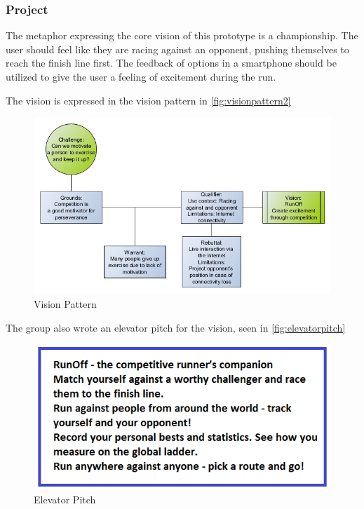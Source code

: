 \subsubsection{Project}
The metaphor expressing the core vision of this prototype is a championship. The user should feel like they are racing against an opponent, pushing themselves to reach the finish line first. The feedback of options in a smartphone should be utilized to give the user a feeling of excitement during the run.

The vision is expressed in the vision pattern in \autoref{fig:visionpattern2}

\begin{figure}[ht]
\begin{center}
 \caption{Vision Pattern}
 \label{fig:visionpattern2}
 \includegraphics[scale=0.5]{img/visionpattern2.png}
\end{center}
\end{figure}

The group also wrote an elevator pitch for the vision, seen in \autoref{fig:elevatorpitch}

\begin{figure}[ht]
\begin{center}
 \caption{Elevator Pitch}
 \label{fig:elevatorpitch}
 \includegraphics[scale=0.5]{img/elevatorpitch.png}
\end{center}
\end{figure}
\vspace{10pt}

